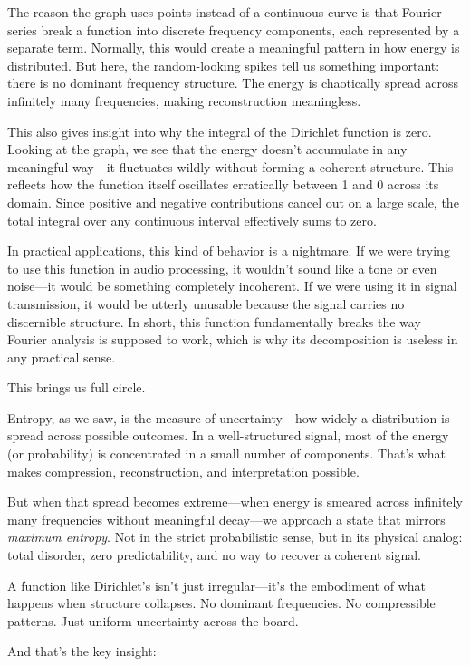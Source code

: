 The reason the graph uses points instead of a continuous curve is that Fourier series break a function into discrete frequency components, each represented by a separate term. Normally, this would create a meaningful pattern in how energy is distributed. But here, the random-looking spikes tell us something important: there is no dominant frequency structure. The energy is chaotically spread across infinitely many frequencies, making reconstruction meaningless.

This also gives insight into why the integral of the Dirichlet function is zero. Looking at the graph, we see that the energy doesn’t accumulate in any meaningful way—it fluctuates wildly without forming a coherent structure. This reflects how the function itself oscillates erratically between 1 and 0 across its domain. Since positive and negative contributions cancel out on a large scale, the total integral over any continuous interval effectively sums to zero.

In practical applications, this kind of behavior is a nightmare. If we were trying to use this function in audio processing, it wouldn’t sound like a tone or even noise—it would be something completely incoherent. If we were using it in signal transmission, it would be utterly unusable because the signal carries no discernible structure. In short, this function fundamentally breaks the way Fourier analysis is supposed to work, which is why its decomposition is useless in any practical sense.

This brings us full circle.

Entropy, as we saw, is the measure of uncertainty—how widely a distribution is spread across possible outcomes. In a well-structured signal, most of the energy (or probability) is concentrated in a small number of components. That’s what makes compression, reconstruction, and interpretation possible.

But when that spread becomes extreme—when energy is smeared across infinitely many frequencies without meaningful decay—we approach a state that mirrors \emph{maximum entropy}. Not in the strict probabilistic sense, but in its physical analog: total disorder, zero predictability, and no way to recover a coherent signal.

A function like Dirichlet’s isn’t just irregular—it’s the embodiment of what happens when structure collapses. No dominant frequencies. No compressible patterns. Just uniform uncertainty across the board.

And that’s the key insight: 


